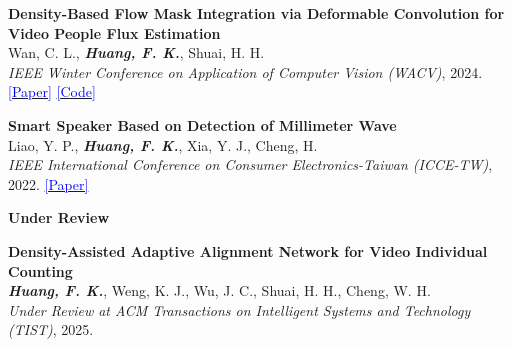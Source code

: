     \item{
        \textbf{Density-Based Flow Mask Integration via Deformable Convolution for Video People Flux Estimation} \\
        Wan, C. L., \textit{\textbf{Huang, F. K.}}, Shuai, H. H. \\
        \textit{IEEE Winter Conference on Application of Computer Vision (WACV)}, 2024. \href{https://openaccess.thecvf.com/content/WACV2024/papers/Wan_Density-Based_Flow_Mask_Integration_via_Deformable_Convolution_for_Video_People_WACV_2024_paper.pdf}{\textcolor{Blue}{[Paper]}} \href{https://github.com/LeoHuang0511/FMDC}{\textcolor{Blue}{[Code]}}
    }

    \item{
        \textbf{Smart Speaker Based on Detection of Millimeter Wave} \\
        Liao, Y. P., \textit{\textbf{Huang, F. K.}}, Xia, Y. J., Cheng, H. \\
        \textit{IEEE International Conference on Consumer Electronics-Taiwan (ICCE-TW)}, 2022. \href{https://doi.org/10.1109/ICCE-Taiwan55306.2022.9868981}{\textcolor{Blue}{[Paper]}}
    }

 \resumeItemListEnd
 
 \vspace{0.5mm}

 \noindent \textbf{\large Under Review}
 \vspace{-2.5mm}
 \resumeItemListStart
    \item{
        \textbf{Density-Assisted Adaptive Alignment Network for Video Individual Counting} \\
        \textit{\textbf{Huang, F. K.}}, Weng, K. J., Wu, J. C., Shuai, H. H., Cheng, W. H. \\
        \textit{Under Review at ACM Transactions on Intelligent Systems and Technology (TIST)}, 2025.
    }
 \resumeItemListEnd
 
 \vspace{-12pt}

